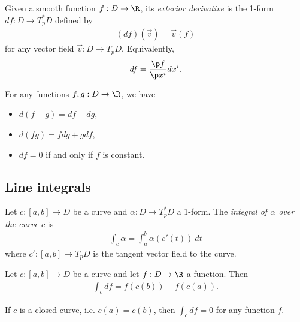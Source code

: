 \documentclass{article}
\begin{document}
\begin{definition}
    Given a smooth function $f:D\to\R$, its \emph{exterior derivative} is the 1-form 
    $df:D\to T^*_pD$ defined by
    \begin{align*}
        (df)(\vec v) = \vec v(f)
    \end{align*}
    for any vector field $\vec v:D\to T_pD$. Equivalently,
    \begin{align*}
        df=\frac{\p f}{\p x^i}dx^i.
    \end{align*}
\end{definition}

\begin{proposition}[Notes 4.20]
    For any functions $f,g:D\to\R$, we have 
    \begin{itemize}
        \item $d(f+g)=df + dg$,
        \item $d(fg) =fdg + gdf$,
        \item $df=0$ if and only if $f$ is constant.
    \end{itemize}
\end{proposition}

\subsection{Line integrals}

\begin{definition}
    Let $c:[a,b]\to D$ be a curve and $\alpha:D\to T_p^*D$ a 1-form. The \emph{integral
    of $\alpha$ over the curve $c$} is 
    \begin{align*}
        \int_c \alpha = \int_a^b \alpha(c'(t))\:dt
    \end{align*}
    where $c':[a,b]\to T_pD$ is the tangent vector field to the curve.
\end{definition}

\begin{proposition}[Notes 4.22]
    Let $c:[a,b]\to D$ be a curve and let $f:D\to\R$ a function. Then
    \begin{align*}
        \int_c df = f(c(b)) - f(c(a)).
    \end{align*}
\end{proposition}

\begin{corollary}
    If $c$ is a closed curve, i.e. $c(a)=c(b)$, then $\int_c df = 0$ for any function $f$.
\end{corollary}
\end{document}

